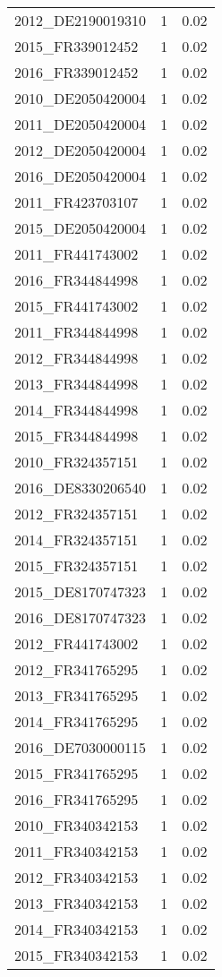 \begin{table*}[htbp]
\begin{tabular}{lrr}
2012_DE2190019310 & 1 & 0.02 \\
2015_FR339012452 & 1 & 0.02 \\
2016_FR339012452 & 1 & 0.02 \\
2010_DE2050420004 & 1 & 0.02 \\
2011_DE2050420004 & 1 & 0.02 \\
2012_DE2050420004 & 1 & 0.02 \\
2016_DE2050420004 & 1 & 0.02 \\
2011_FR423703107 & 1 & 0.02 \\
2015_DE2050420004 & 1 & 0.02 \\
2011_FR441743002 & 1 & 0.02 \\
2016_FR344844998 & 1 & 0.02 \\
2015_FR441743002 & 1 & 0.02 \\
2011_FR344844998 & 1 & 0.02 \\
2012_FR344844998 & 1 & 0.02 \\
2013_FR344844998 & 1 & 0.02 \\
2014_FR344844998 & 1 & 0.02 \\
2015_FR344844998 & 1 & 0.02 \\
2010_FR324357151 & 1 & 0.02 \\
2016_DE8330206540 & 1 & 0.02 \\
2012_FR324357151 & 1 & 0.02 \\
2014_FR324357151 & 1 & 0.02 \\
2015_FR324357151 & 1 & 0.02 \\
2015_DE8170747323 & 1 & 0.02 \\
2016_DE8170747323 & 1 & 0.02 \\
2012_FR441743002 & 1 & 0.02 \\
2012_FR341765295 & 1 & 0.02 \\
2013_FR341765295 & 1 & 0.02 \\
2014_FR341765295 & 1 & 0.02 \\
2016_DE7030000115 & 1 & 0.02 \\
2015_FR341765295 & 1 & 0.02 \\
2016_FR341765295 & 1 & 0.02 \\
2010_FR340342153 & 1 & 0.02 \\
2011_FR340342153 & 1 & 0.02 \\
2012_FR340342153 & 1 & 0.02 \\
2013_FR340342153 & 1 & 0.02 \\
2014_FR340342153 & 1 & 0.02 \\
2015_FR340342153 & 1 & 0.02 \\

\end{tabular}
\end{table*}
